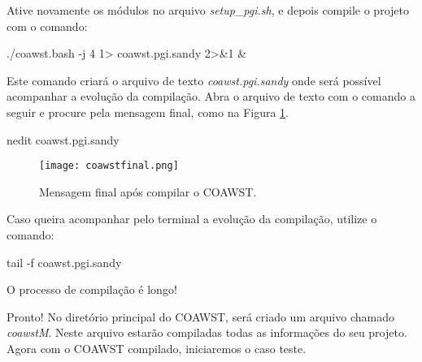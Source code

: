 \noindent Ative novamente os módulos no arquivo \textit{setup\_pgi.sh}, e depois compile o projeto com o comando:
\bigskip

\begin{bashcode}
./coawst.bash -j 4  1> coawst.pgi.sandy 2>&1 &
\end{bashcode}
\bigskip

\noindent Este comando criará o arquivo de texto \textit{coawst.pgi.sandy} onde será possível acompanhar a evolução da compilação. Abra o arquivo de texto com o comando a seguir e procure pela mensagem final, como na Figura \textcolor{bleu_cite}{\ref{compcoafinal}}.
\bigskip

\begin{bashcode}
nedit coawst.pgi.sandy
\end{bashcode}
\bigskip

\begin{figure}[H]
    \centering
    \captionsetup{justification=justified}
    \texttt{[image: coawstfinal.png]}
    \caption{Mensagem final após compilar o COAWST.}
    \label{compcoafinal}
\end{figure}
\bigskip

\noindent Caso queira acompanhar pelo terminal a evolução da compilação, utilize o comando:
\bigskip

\begin{bashcode}
tail -f coawst.pgi.sandy
\end{bashcode}
\bigskip

\begin{tcolorbox}[enhanced,
  grow to left by=0cm,%
  grow to right by=0cm,%
  enlarge top by=0cm,%
  enlarge bottom by=0cm,%
  tcbox raise base,
  boxrule=1.0pt,
  left=18mm,
  colframe=red!50!black,coltext=red!25!black,colback=red!10!white,
  overlay={\begin{tcbclipinterior}\fill[red!75!blue!50!white] (frame.south west)
    rectangle node[text=white,font=\sffamily\bfseries\footnotesize,rotate=0] {ATENÇÃO} ([xshift=18mm]frame.north west);\end{tcbclipinterior}}]
O processo de compilação é longo!
\end{tcolorbox}
\bigskip


\noindent Pronto! No diretório principal do COAWST, será criado um arquivo chamado \textit{coawstM}. Neste arquivo estarão compiladas todas as informações do seu projeto. Agora com o COAWST compilado, iniciaremos o caso teste.
\bigskip


